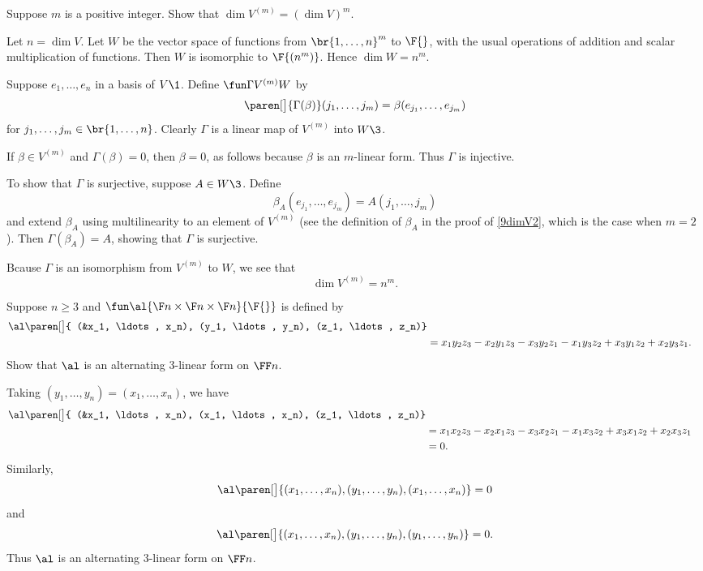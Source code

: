 
\exercise
Suppose $m$ is a positive integer. Show that $\dim V^{(m)} = (\dim V)^m\!$.

\begin{Solution}
Let $n = \dim V$. Let $W$ be the vector space of functions from $\br{1, \ldots, n}^m$ to $\F{}$, with the usual operations of addition and scalar multiplication of functions. Then $W$ is isomorphic to $\F {(n^m)}$. Hence $\dim W = n^m\!$.

Suppose $e_1, \ldots, e_n$ in a basis of $V\1$. Define $\fun \Gamma { V^{(m)} } W$ by
\[
\paren[\big]{\Gamma(\beta)}(j_1, \ldots, j_m) = \beta(e_{j_1}, \ldots, e_{j_m})
\]
for $ j_1, \ldots, j_m \in \br{1, \ldots, n}$. Clearly $\Gamma$ is a linear map of $V^{(m)}$ into $W\3$.

If $\beta \in V^{(m)}$ and $\Gamma(\beta) = 0$, then $\beta = 0$, as follows because $\beta$ is an $m$-linear form. Thus $\Gamma$ is injective.

To show that $\Gamma$ is surjective, suppose $A \in W\3$. Define
\[
\beta_A(e_{j_1}, \ldots, e_{j_m}) = A(j_1, \ldots, j_m)
\]
and extend $\beta_A$ using multilinearity to an element of $V^{(m)}$ (see the definition of $\beta_A$ in the proof of \ref{9dimV2}, which is the case when $m=2$). Then $\Gamma(\beta_A) = A$, showing that $\Gamma$ is surjective.

Bcause $\Gamma$ is an isomorphism from $V^{(m)}$ to $W$, we see that
\[
\dim V^{(m)} = n^m\!.
\]
\end{Solution}

\exercise
Suppose $n \ge 3$ and $\fun \al {\F n \times \F n \times \F n} {\F{}}$ is defined by
\begin{align*}
\al\paren[\big]{ (&x_1, \ldots, x_n), (y_1, \ldots, y_n), (z_1, \ldots, z_n)} \\
&= x_1 y_2 z_3 - x_2 y_1 z_3 - x_3 y_2 z_1
-x_1 y_3 z_2 + x_3 y_1 z_2 + x_2 y_3 z_1.
\end{align*}
Show that $\al$ is an alternating $3$-linear form on $\FF n$.\label{9threelin}

\begin{Solution}
Taking $(y_1, \ldots, y_n) = (x_1, \ldots, x_n)$, we have
\begin{align*}
\al\paren[\big]{ (&x_1, \ldots, x_n), (x_1, \ldots, x_n), (z_1, \ldots, z_n)} \\
&= x_1 x_2 z_3 - x_2 x_1 z_3 - x_3 x_2 z_1
-x_1 x_3 z_2 + x_3 x_1 z_2 + x_2 x_3 z_1 \\
&= 0.
\end{align*}
Similarly,
\[
\al\paren[\big]{ (x_1, \ldots, x_n), (y_1, \ldots, y_n), (x_1, \ldots, x_n)} = 0
\]
and
\[
\al\paren[\big]{ (x_1, \ldots, x_n), (y_1, \ldots, y_n), (y_1, \ldots, y_n)} =0.
\]
Thus  $\al$ is an alternating $3$-linear form on $\FF n$.
\end{Solution}

